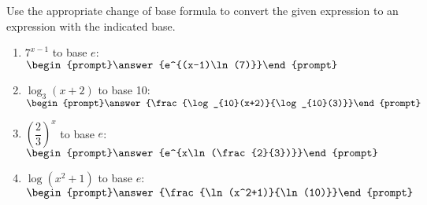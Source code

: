 \documentclass{ximera}
\author{Carl Stitz \and Jeff Zeager \and Bart Snapp \and Matthew Carr}
\begin{document}
\begin{exercise}





Use the appropriate change of base formula to convert the given
expression to an expression with the indicated base.

\begin{enumerate}
\item $7^{x - 1}$ to base $e$: $\begin{prompt}\answer{e^{(x-1)\ln(7)}}\end{prompt}$ \label{changeofbasefirst}
\item $\log_{3}(x + 2)$ to base 10: $\begin{prompt}\answer{\frac{\log_{10}(x+2)}{\log_{10}(3)}}\end{prompt}$
\item $\left(\dfrac{2}{3}\right)^{x}$ to base $e$: $\begin{prompt}\answer{e^{x\ln(\frac{2}{3})}}\end{prompt}$
\item $\log(x^{2} + 1)$ to base $e$:  $\begin{prompt}\answer{\frac{\ln(x^2+1)}{\ln(10)}}\end{prompt}$ \label{changeofbaselast}
\end{enumerate}

\end{exercise}
\end{document}
